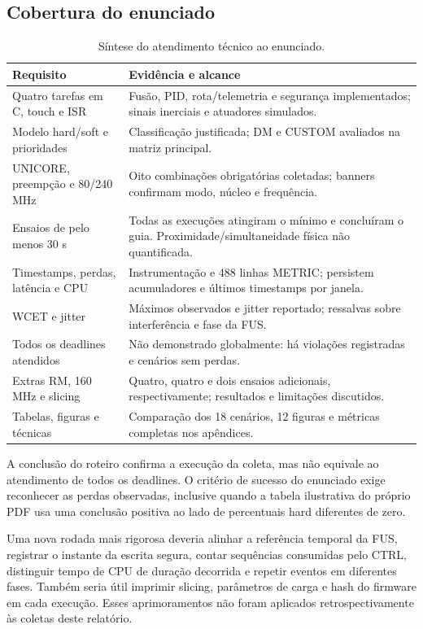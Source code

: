 \subsection{Cobertura do enunciado}

\begin{table}[!htbp]\centering\small
\caption{Síntese do atendimento técnico ao enunciado.}\label{tab:cobertura}
\begin{tabularx}{\linewidth}{P{4.2cm}Y}\toprule
Requisito & Evidência e alcance\\\midrule
Quatro tarefas em C, touch e ISR & Fusão, PID, rota/telemetria e segurança implementados; sinais inerciais e atuadores simulados.\\
Modelo hard/soft e prioridades & Classificação justificada; DM e CUSTOM avaliados na matriz principal.\\
UNICORE, preempção e 80/240 MHz & Oito combinações obrigatórias coletadas; banners confirmam modo, núcleo e frequência.\\
Ensaios de pelo menos 30 s & Todas as execuções atingiram o mínimo e concluíram o guia. Proximidade/simultaneidade física não quantificada.\\
Timestamps, perdas, latência e CPU & Instrumentação e 488 linhas METRIC; persistem acumuladores e últimos timestamps por janela.\\
WCET e jitter & Máximos observados e jitter reportado; ressalvas sobre interferência e fase da FUS.\\
Todos os deadlines atendidos & Não demonstrado globalmente: há violações registradas e cenários sem perdas.\\
Extras RM, 160 MHz e slicing & Quatro, quatro e dois ensaios adicionais, respectivamente; resultados e limitações discutidos.\\
Tabelas, figuras e técnicas & Comparação dos 18 cenários, 12 figuras e métricas completas nos apêndices.\\\bottomrule
\end{tabularx}
\par{}
\end{table}

A conclusão do roteiro confirma a execução da coleta, mas não equivale ao atendimento de todos os deadlines. O critério de sucesso do enunciado exige reconhecer as perdas observadas, inclusive quando a tabela ilustrativa do próprio PDF usa uma conclusão positiva ao lado de percentuais hard diferentes de zero.

Uma nova rodada mais rigorosa deveria alinhar a referência temporal da FUS, registrar o instante da escrita segura, contar sequências consumidas pelo CTRL, distinguir tempo de CPU de duração decorrida e repetir eventos em diferentes fases. Também seria útil imprimir slicing, parâmetros de carga e hash do firmware em cada execução. Esses aprimoramentos não foram aplicados retrospectivamente às coletas deste relatório.

\FloatBarrier
